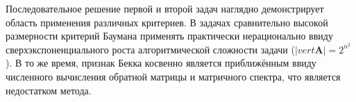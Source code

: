 Последовательное решение первой и второй задач наглядно демонстрирует область применения различных критериев. В задачах сравнительно высокой размерности критерий Баумана применять практически нерационально ввиду сверхэкспоненциального роста алгоритмической сложности задачи ($|vert \mathbf{A}| = 2 ^ {n ^ 2}$). В то же время, признак Бекка косвенно является приближённым ввиду численного вычисления обратной матрицы и матричного спектра, что является недостатком метода.